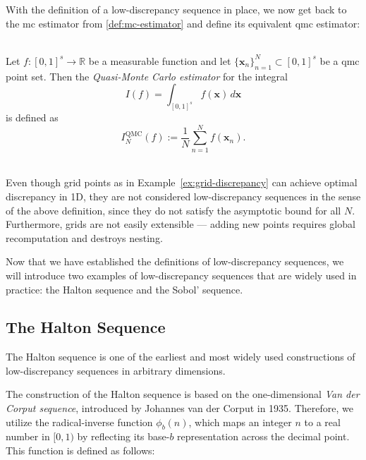 With the definition of a low-discrepancy sequence in place, we now get back to
the \ac{mc} estimator from \ref{def:mc-estimator} and define its equivalent
\ac{qmc} estimator:

\begin{definition} \ \\
Let $f \colon [0,1]^s \to \mathbb{R}$ be a measurable function and let
$\{\boldsymbol{x}_n\}_{n=1}^{N} \subset [0,1]^s$ be a \ac{qmc} point set. Then
the \emph{Quasi-Monte Carlo estimator} for the integral
\begin{equation*}
    I(f) = \int_{[0,1]^s} f(\boldsymbol{x}) \, d\boldsymbol{x}
\end{equation*}
is defined as
\begin{equation}
I_N^{\mathrm{QMC}}(f) := \frac{1}{N} \sum_{n=1}^{N} f(\boldsymbol{x}_n).
\end{equation}
\end{definition}

\begin{remark} \ \\
Even though grid points as in Example~\ref{ex:grid-discrepancy} can achieve
optimal discrepancy in 1D, they are not considered low-discrepancy sequences in
the sense of the above definition, since they do not satisfy the asymptotic
bound for all $N$. Furthermore, grids are not easily extensible --- adding new
points requires global recomputation and destroys nesting.
\end{remark}

Now that we have established the definitions of low-discrepancy sequences, we
will introduce two examples of low-discrepancy sequences that are widely used in
practice: the Halton sequence and the Sobol' sequence.

\subsection{The Halton Sequence}
\label{subsec:halton-sequence}

The Halton sequence is one of the earliest and most widely used constructions of
low-discrepancy sequences in arbitrary dimensions. 

The construction of the Halton sequence is based on the one-dimensional
\emph{Van der Corput sequence}, introduced by Johannes van der Corput in 1935.
Therefore, we utilize the radical-inverse function $\phi_b(n)$, which maps an
integer $n$ to a real number in $[0,1)$ by reflecting its base-$b$
representation across the decimal point. This function is defined as follows:

